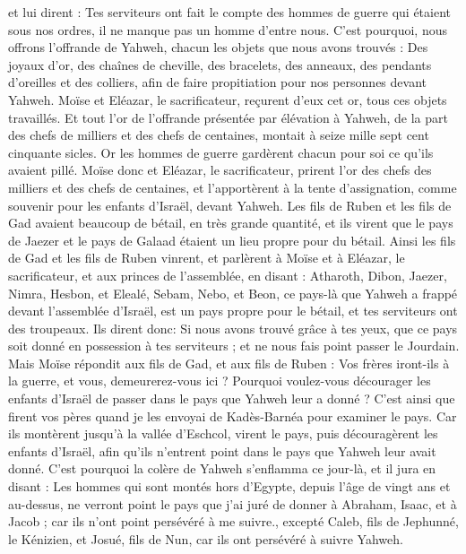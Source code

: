 \begin{multicols}{2}
et lui dirent : Tes serviteurs ont fait le compte des hommes de guerre qui étaient sous nos ordres, il ne manque pas un homme d'entre nous.
C'est pourquoi, nous offrons l'offrande de Yahweh, chacun les objets que nous avons trouvés : Des joyaux d'or, des chaînes de cheville, des bracelets, des anneaux, des pendants d'oreilles et des colliers, afin de faire propitiation pour nos personnes devant Yahweh.
Moïse et Eléazar, le sacrificateur, reçurent d'eux cet or, tous ces objets travaillés.
Et tout l'or de l'offrande présentée par élévation à Yahweh, de la part des chefs de milliers et des chefs de centaines, montait à seize mille sept cent cinquante sicles.
Or les hommes de guerre gardèrent chacun pour soi ce qu'ils avaient pillé.
Moïse donc et Eléazar, le sacrificateur, prirent l'or des chefs des milliers et des chefs de centaines, et l'apportèrent à la tente d'assignation, comme souvenir pour les enfants d'Israël, devant Yahweh.
\VerseOne{}Les fils de Ruben et les fils de Gad avaient beaucoup de bétail, en très grande quantité, et ils virent que le pays de Jaezer et le pays de Galaad étaient un lieu propre pour du bétail.
Ainsi les fils de Gad et les fils de Ruben vinrent, et parlèrent à Moïse et à Eléazar, le sacrificateur, et aux princes de l'assemblée, en disant :
Atharoth, Dibon, Jaezer, Nimra, Hesbon, et Elealé, Sebam, Nebo, et Beon,
ce pays-là que Yahweh a frappé devant l'assemblée d'Israël, est un pays propre pour le bétail, et tes serviteurs ont des troupeaux.
Ils dirent donc: Si nous avons trouvé grâce à tes yeux, que ce pays soit donné en possession à tes serviteurs ; et ne nous fais point passer le Jourdain.
Mais Moïse répondit aux fils de Gad, et aux fils de Ruben : Vos frères iront-ils à la guerre, et vous, demeurerez-vous ici ?
Pourquoi voulez-vous décourager les enfants d'Israël de passer dans le pays que Yahweh leur a donné ?
C'est ainsi que firent vos pères quand je les envoyai de Kadès-Barnéa pour examiner le pays.
Car ils montèrent jusqu'à la vallée d'Eschcol, virent le pays, puis découragèrent les enfants d'Israël, afin qu'ils n'entrent point dans le pays que Yahweh leur avait donné.
C'est pourquoi la colère de Yahweh s'enflamma ce jour-là, et il jura en disant :
Les hommes qui sont montés hors d'Egypte, depuis l'âge de vingt ans et au-dessus, ne verront point le pays que j'ai juré de donner à Abraham, Isaac, et à Jacob ; car ils n’ont point persévéré à me suivre.,
excepté Caleb, fils de Jephunné, le Kénizien, et Josué, fils de Nun,  car ils ont persévéré à suivre Yahweh.

\end{multicols}
